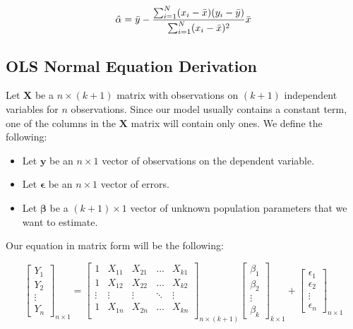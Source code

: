 \documentclass{article}
\begin{document}
\begin{equation}
    \hat{\alpha} = \Bar{y} - \frac{\sum_{i=1}^N (x_i - \Bar{x})(y_i - \Bar{y})}{\sum_{i=1}^N (x_i - \Bar{x})^2} \Bar{x}
\end{equation}


\subsection{OLS Normal Equation Derivation}

Let $\mathbf{X}$ be a $n \times (k+1)$ matrix with observations on $(k+1)$ independent variables for $n$ observations. Since our model usually contains a constant term, one of the columns in the $\mathbf{X}$ matrix will contain only ones. We define the following:

\begin{itemize}
    \item Let $\mathbf{y}$ be an $n \times 1$ vector of observations on the dependent variable.
    \item Let $\bm{\epsilon}$ be an $n \times 1$ vector of errors.
    \item Let $\bm{\beta}$ be a $(k+1) \times 1$ vector of unknown population parameters that we want to estimate.
\end{itemize}

\noindent Our equation in matrix form will be the following:

\begin{equation*}
    \begin{bmatrix}
        Y_1 \\
        Y_2 \\
        \vdots \\
        Y_n
    \end{bmatrix}_{n \times 1}
    = 
    \begin{bmatrix}
        1 & X_{11} & X_{21} & \dots & X_{k1} \\
        1 & X_{12} & X_{22} & \dots & X_{k2} \\
        \vdots & \vdots & \vdots & \ddots & \vdots\\
        1 & X_{1n} & X_{2n} & \dots & X_{kn} \\
    \end{bmatrix}_{n \times (k+1)}
    \begin{bmatrix}
        \beta_1 \\
        \beta_2 \\
        \vdots \\
        \beta_k
    \end{bmatrix}_{k \times 1}
    + 
    \begin{bmatrix}
        \epsilon_1 \\
        \epsilon_2 \\
        \vdots \\
        \epsilon_n
    \end{bmatrix}_{n \times 1}
\end{equation*}
\end{document}
